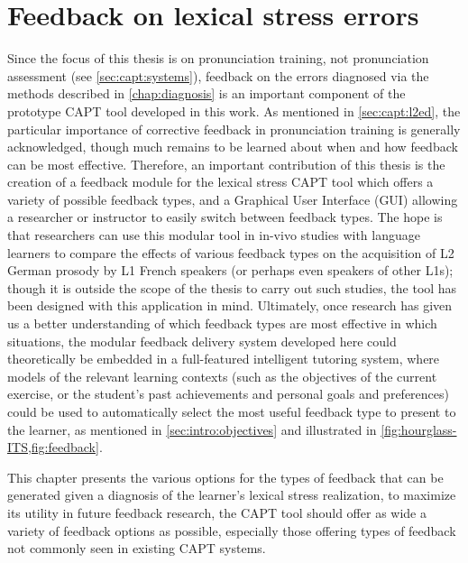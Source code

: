 %
%
\chapter{Feedback on lexical stress errors}
\label{chap:feedback}


Since the focus of this thesis is on pronunciation training, not pronunciation assessment (see \cref{sec:capt:systems}), feedback on the errors diagnosed via the methods described in \cref{chap:diagnosis} is an important component of the prototype CAPT tool developed in this work. As mentioned in \cref{sec:capt:l2ed}, the particular importance of corrective feedback in pronunciation training is generally acknowledged,
though much remains to be learned about when and how feedback can be most effective. Therefore, an important contribution of this thesis is the creation of a feedback module for the lexical stress CAPT tool which offers a variety of possible feedback types, and a Graphical User Interface (GUI) allowing a researcher or instructor to easily switch between feedback types. The hope is that researchers can use this modular tool in in-vivo studies with language learners to compare the effects of various feedback types on the acquisition of L2 German prosody by L1 French speakers (or perhaps even speakers of other L1s); though it is outside the scope of the thesis to carry out 
such studies,
the tool has been designed 
with this application in mind.
Ultimately, once research has given us a better understanding of which feedback types are most effective in which situations, the modular feedback delivery system developed here could theoretically be embedded in a full-featured intelligent tutoring system, where models of the relevant learning contexts (such as  the objectives of the current exercise, or the student's past achievements and personal goals and preferences) could be used to automatically select the most useful feedback type to present to the learner, as mentioned in \cref{sec:intro:objectives} and illustrated in \cref{fig:hourglass-ITS,fig:feedback}.

This chapter presents the various options for the types of feedback that can be generated given a diagnosis of the learner's lexical stress realization, 
 to maximize its utility in future feedback research, the CAPT tool should offer as wide a variety of feedback options as possible, especially those offering types of feedback not commonly seen in existing CAPT systems. 

